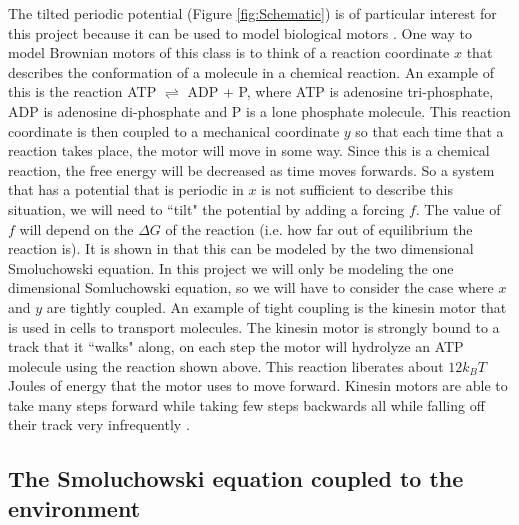 \documentclass[11pt]{article} %
\begin{document}
The tilted periodic potential (Figure \ref{fig:Schematic}) is of particular interest for this project because it can be used to model biological motors \cite{Leibler1993,Magnasco1994}. One way to model Brownian motors of this class is to think of a reaction coordinate $x$ that describes the conformation of a molecule in a chemical reaction. An example of this is the reaction ATP $\rightleftharpoons$ ADP + P, where ATP is adenosine tri-phosphate, ADP is adenosine di-phosphate and P is a lone phosphate molecule. This reaction coordinate is then coupled to a mechanical coordinate $y$ so that each time that a reaction takes place, the motor will move in some way. Since this is a chemical reaction, the free energy will be decreased as time moves forwards. So a system that has a potential that is periodic in $x$ is not sufficient to describe this situation, we will need to ``tilt" the potential by adding a forcing $f$. The value of $f$ will depend on the $\Delta G$ of the reaction (i.e. how far out of equilibrium the reaction is). It is shown in \cite{Magnasco1994} that this can be modeled by the two dimensional Smoluchowski equation. In this project we will only be modeling the one dimensional Somluchowski equation, so we will have to consider the case where $x$ and $y$ are tightly coupled. An example of tight coupling is the kinesin motor \cite{Leibler1993} that is used in cells to transport molecules. The kinesin motor is strongly bound to a track that it ``walks" along, on each step the motor will hydrolyze an ATP molecule using the reaction shown above. This reaction liberates about $12 k_B T$ Joules of energy that the motor uses to move forward. Kinesin motors are able to take many steps forward while taking few steps backwards all while falling off their track very infrequently \cite{BlockSM1990}.

\subsection{The Smoluchowski equation coupled to the environment} \label{Smoluchowski}
\end{document}

